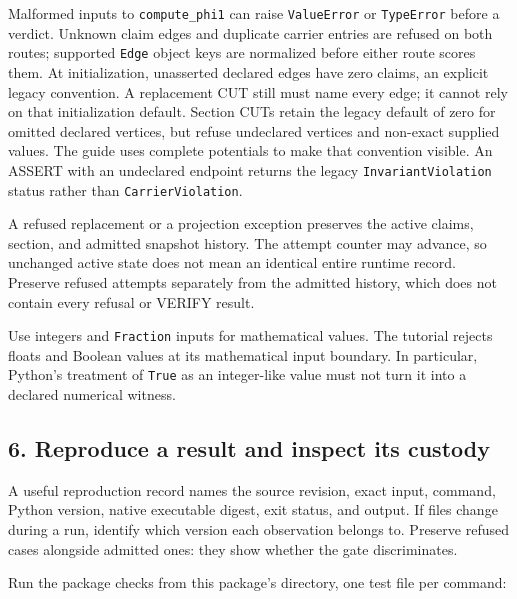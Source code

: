 \documentclass[
  11pt,
]{article}
\begin{document}
Malformed inputs to \texttt{compute\_phi1} can raise \texttt{ValueError}
or \texttt{TypeError} before a verdict. Unknown claim edges and
duplicate carrier entries are refused on both routes; supported
\texttt{Edge} object keys are normalized before either route scores
them. At initialization, unasserted declared edges have zero claims, an
explicit legacy convention. A replacement CUT still must name every
edge; it cannot rely on that initialization default. Section CUTs retain
the legacy default of zero for omitted declared vertices, but refuse
undeclared vertices and non-exact supplied values. The guide uses
complete potentials to make that convention visible. An ASSERT with an
undeclared endpoint returns the legacy \texttt{InvariantViolation}
status rather than \texttt{CarrierViolation}.

A refused replacement or a projection exception preserves the active
claims, section, and admitted snapshot history. The attempt counter may
advance, so unchanged active state does not mean an identical entire
runtime record. Preserve refused attempts separately from the admitted
history, which does not contain every refusal or VERIFY result.

Use integers and \texttt{Fraction} inputs for mathematical values. The
tutorial rejects floats and Boolean values at its mathematical input
boundary. In particular, Python's treatment of \texttt{True} as an
integer-like value must not turn it into a declared numerical witness.

\hypertarget{reproduce-a-result-and-inspect-its-custody}{%
\subsection{6. Reproduce a result and inspect its
custody}\label{reproduce-a-result-and-inspect-its-custody}}

A useful reproduction record names the source revision, exact input,
command, Python version, native executable digest, exit status, and
output. If files change during a run, identify which version each
observation belongs to. Preserve refused cases alongside admitted ones:
they show whether the gate discriminates.

Run the package checks from this package's directory, one test file per
command:
\end{document}
